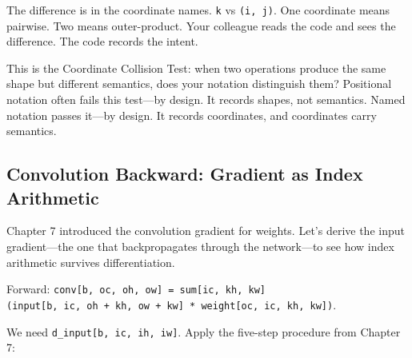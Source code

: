 \documentclass[11pt,titlepage]{article}
\begin{document}
The difference is in the coordinate names. \texttt{k} vs
\texttt{(i,\ j)}. One coordinate means pairwise. Two means
outer-product. Your colleague reads the code and sees the difference.
The code records the intent.

This is the Coordinate Collision Test: when two operations produce the
same shape but different semantics, does your notation distinguish them?
Positional notation often fails this test---by design. It records
shapes, not semantics. Named notation passes it---by design. It records
coordinates, and coordinates carry semantics.

\vspace{2em}

\hypertarget{convolution-backward-gradient-as-index-arithmetic}{%
\subsection{Convolution Backward: Gradient as Index
Arithmetic}\label{convolution-backward-gradient-as-index-arithmetic}}

Chapter 7 introduced the convolution gradient for weights. Let's derive
the input gradient---the one that backpropagates through the
network---to see how index arithmetic survives differentiation.

Forward:
\texttt{conv{[}b,\ oc,\ oh,\ ow{]}\ =\ sum{[}ic,\ kh,\ kw{]}(input{[}b,\ ic,\ oh\ +\ kh,\ ow\ +\ kw{]}\ *\ weight{[}oc,\ ic,\ kh,\ kw{]})}.

We need \texttt{d\_input{[}b,\ ic,\ ih,\ iw{]}}. Apply the five-step
procedure from Chapter 7:
\end{document}
